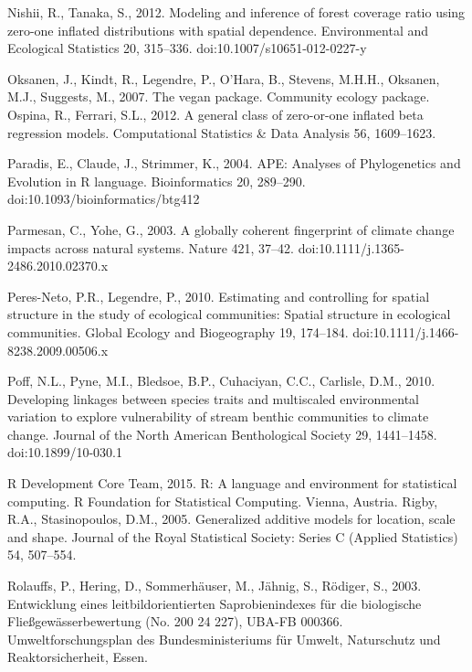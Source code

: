 \begin{thebibliography}
\bibitem{} \hangindent=1cm Nishii, R., Tanaka, S., 2012. Modeling and inference of forest coverage ratio using zero-one inflated distributions with spatial dependence. Environmental and Ecological Statistics 20, 315–336. doi:10.1007/s10651-012-0227-y

\bibitem{} \hangindent=1cm Oksanen, J., Kindt, R., Legendre, P., O’Hara, B., Stevens, M.H.H., Oksanen, M.J., Suggests, M., 2007. The vegan package. Community ecology package.
Ospina, R., Ferrari, S.L., 2012. A general class of zero-or-one inflated beta regression models. Computational Statistics & Data Analysis 56, 1609–1623.

\bibitem{} \hangindent=1cm Paradis, E., Claude, J., Strimmer, K., 2004. APE: Analyses of Phylogenetics and Evolution in R language. Bioinformatics 20, 289–290. doi:10.1093/bioinformatics/btg412

\bibitem{} \hangindent=1cm Parmesan, C., Yohe, G., 2003. A globally coherent fingerprint of climate change impacts across natural systems. Nature 421, 37–42. doi:10.1111/j.1365-2486.2010.02370.x

\bibitem{} \hangindent=1cm Peres-Neto, P.R., Legendre, P., 2010. Estimating and controlling for spatial structure in the study of ecological communities: Spatial structure in ecological communities. Global Ecology and Biogeography 19, 174–184. doi:10.1111/j.1466-8238.2009.00506.x

\bibitem{} \hangindent=1cm Poff, N.L., Pyne, M.I., Bledsoe, B.P., Cuhaciyan, C.C., Carlisle, D.M., 2010. Developing linkages between species traits and multiscaled environmental variation to explore vulnerability of stream benthic communities to climate change. Journal of the North American Benthological Society 29, 1441–1458. doi:10.1899/10-030.1

\bibitem{} \hangindent=1cm R Development Core Team, 2015. R: A language and environment for statistical computing. R Foundation for Statistical Computing. Vienna, Austria.
Rigby, R.A., Stasinopoulos, D.M., 2005. Generalized additive models for location, scale and shape. Journal of the Royal Statistical Society: Series C (Applied Statistics) 54, 507–554.

\bibitem{} \hangindent=1cm Rolauffs, P., Hering, D., Sommerhäuser, M., Jähnig, S., Rödiger, S., 2003. Entwicklung eines leitbildorientierten Saprobienindexes für die biologische Fließgewässerbewertung (No. 200 24 227), UBA-FB 000366. Umweltforschungsplan des Bundesministeriums für Umwelt, Naturschutz und Reaktorsicherheit, Essen.


\end{thebibliography}
